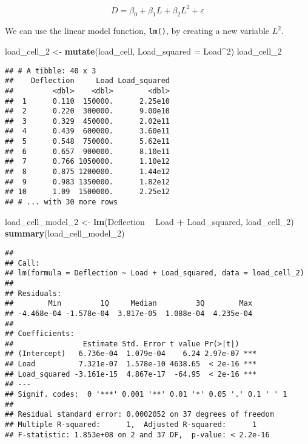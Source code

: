 \documentclass[]{book}
\newenvironment{Shaded}{\begin{snugshade}}{\end{snugshade}}
\newcommand{\DataTypeTok}[1]{\textcolor[rgb]{0.13,0.29,0.53}{#1}}
\newcommand{\DecValTok}[1]{\textcolor[rgb]{0.00,0.00,0.81}{#1}}
\newcommand{\KeywordTok}[1]{\textcolor[rgb]{0.13,0.29,0.53}{\textbf{#1}}}
\newcommand{\NormalTok}[1]{#1}
\newcommand{\OperatorTok}[1]{\textcolor[rgb]{0.81,0.36,0.00}{\textbf{#1}}}
\newcommand{\StringTok}[1]{\textcolor[rgb]{0.31,0.60,0.02}{#1}}
\theoremstyle{definition}
\theoremstyle{definition}
\theoremstyle{definition}
\theoremstyle{remark}
\begin{document}
\[ D = \beta_0 + \beta_1 L + \beta_2 L^2 + \varepsilon \]

We can use the linear model function, \texttt{lm()}, by creating a new
variable \(L^2\).

\begin{Shaded}
\begin{Highlighting}[]
\NormalTok{load_cell_}\DecValTok{2}\NormalTok{ <-}\StringTok{ }\KeywordTok{mutate}\NormalTok{(load_cell, }\DataTypeTok{Load_squared =}\NormalTok{ Load}\OperatorTok{^}\DecValTok{2}\NormalTok{)}
\NormalTok{load_cell_}\DecValTok{2}
\end{Highlighting}
\end{Shaded}

\begin{verbatim}
## # A tibble: 40 x 3
##    Deflection     Load Load_squared
##         <dbl>    <dbl>        <dbl>
##  1      0.110  150000.      2.25e10
##  2      0.220  300000.      9.00e10
##  3      0.329  450000.      2.02e11
##  4      0.439  600000.      3.60e11
##  5      0.548  750000.      5.62e11
##  6      0.657  900000.      8.10e11
##  7      0.766 1050000.      1.10e12
##  8      0.875 1200000.      1.44e12
##  9      0.983 1350000.      1.82e12
## 10      1.09  1500000.      2.25e12
## # ... with 30 more rows
\end{verbatim}

\begin{Shaded}
\begin{Highlighting}[]
\NormalTok{load_cell_model_}\DecValTok{2}\NormalTok{ <-}\StringTok{ }\KeywordTok{lm}\NormalTok{(Deflection }\OperatorTok{~}\StringTok{ }\NormalTok{Load }\OperatorTok{+}\StringTok{ }\NormalTok{Load_squared, load_cell_}\DecValTok{2}\NormalTok{)}
\KeywordTok{summary}\NormalTok{(load_cell_model_}\DecValTok{2}\NormalTok{)}
\end{Highlighting}
\end{Shaded}

\begin{verbatim}
## 
## Call:
## lm(formula = Deflection ~ Load + Load_squared, data = load_cell_2)
## 
## Residuals:
##        Min         1Q     Median         3Q        Max 
## -4.468e-04 -1.578e-04  3.817e-05  1.088e-04  4.235e-04 
## 
## Coefficients:
##                Estimate Std. Error t value Pr(>|t|)    
## (Intercept)   6.736e-04  1.079e-04    6.24 2.97e-07 ***
## Load          7.321e-07  1.578e-10 4638.65  < 2e-16 ***
## Load_squared -3.161e-15  4.867e-17  -64.95  < 2e-16 ***
## ---
## Signif. codes:  0 '***' 0.001 '**' 0.01 '*' 0.05 '.' 0.1 ' ' 1
## 
## Residual standard error: 0.0002052 on 37 degrees of freedom
## Multiple R-squared:      1,  Adjusted R-squared:      1 
## F-statistic: 1.853e+08 on 2 and 37 DF,  p-value: < 2.2e-16
\end{verbatim}
\end{document}
